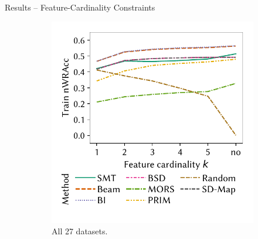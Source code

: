 \documentclass[en, navbaroff, handout]{sdqbeamer}
\begin{document}
\begin{frame}[t]{Results -- Feature-Cardinality Constraints}
	\begin{figure}
		\centering
		\begin{subfigure}[t]{0.35\textwidth}
			\centering
			\includegraphics[width=\textwidth, trim=10 25 10 10, clip]{plots/csd-cardinality-train-nwracc-all-datasets.pdf}
			\caption{All 27 datasets.}
			\label{fig:csd:cardinality-train-nwracc-all-datasets}
		\end{subfigure}
		\pause
		\hspace{\kitcolumnsep}
		\begin{subfigure}[t]{0.35\textwidth}

\end{subfigure}
\end{figure}
\end{frame}
\end{document}
